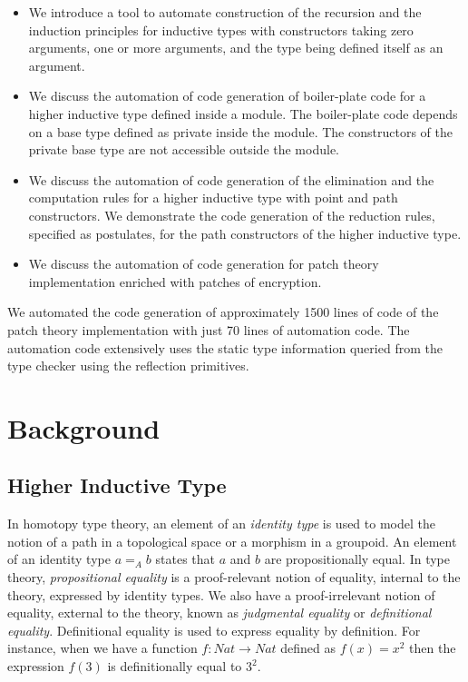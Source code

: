 \documentclass[sigplan,10pt]{acmart}
\begin{document}
\begin{itemize}
\item We introduce a tool to automate construction of the recursion and the induction principles for inductive types with constructors taking zero arguments, one or more arguments, and the type being defined itself as an argument.

\item We discuss the automation of code generation of boiler-plate code for a higher inductive type defined inside a module. The boiler-plate code depends on a base type defined as private inside the module. The constructors of the private base type are not accessible outside the module.

\item We discuss the automation of code generation of the elimination and the computation rules for a higher inductive type with point and path constructors. We demonstrate the code generation of the reduction rules, specified as postulates, for the path constructors of the higher inductive type.

\item We discuss the automation of code generation for patch theory \cite{Angiuli-2014} implementation enriched with patches of encryption. 

\end{itemize}

We automated the code generation of approximately 1500 lines of code of the patch theory implementation with just 70 lines of automation code. The automation code extensively uses the static type information queried from the type checker using the reflection primitives.

\section{Background}
\label{sec:sec2}

\subsection{Higher Inductive Type}
\label{sec:sec2.1}

In homotopy type theory, an element of an \emph{identity type} is used to model the notion of a path in a topological space or a morphism in a groupoid. An element of an identity type $a =_A b$ states that $a$ and $b$ are propositionally equal. In type theory, \emph{propositional equality} is a proof-relevant notion of equality, internal to the theory, expressed by identity types. We also have a proof-irrelevant notion of equality, external to the theory, known as \emph{judgmental equality} or \emph{definitional equality}. Definitional equality is used to express equality by definition. For instance, when we have a function $f : Nat \rightarrow Nat$ defined as $f(x) = x^2$ then the expression $f(3)$ is definitionally equal to $3^2$. 
\end{document}
